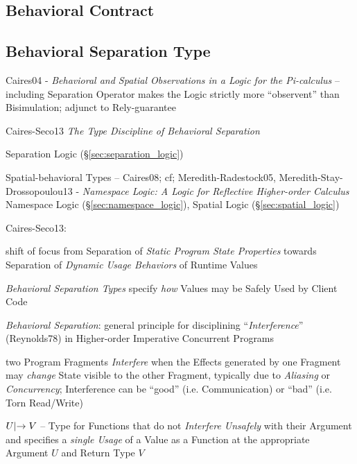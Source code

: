 \subsection{Behavioral Contract}\label{sec:behavioral_contract}

\subsection{Behavioral Separation Type}\label{sec:behavioral_separation}

Caires04 - \emph{Behavioral and Spatial Observations in a Logic for the
  Pi-calculus} -- including Separation Operator makes the Logic strictly more
``observent'' than Bisimulation; adjunct to Rely-guarantee

Caires-Seco13 \emph{The Type Discipline of Behavioral Separation}

Separation Logic (\S\ref{sec:separation_logic})

Spatial-behavioral Types -- Caires08; cf; Meredith-Radestock05,
Meredith-Stay-Drossopoulou13 - \emph{Namespace Logic: A Logic for Reflective
  Higher-order Calculus} \fist Namespace Logic
(\S\ref{sec:namespace_logic}), Spatial Logic (\S\ref{sec:spatial_logic})

Caires-Seco13:

shift of focus from Separation of \emph{Static Program State
  Properties} towards Separation of \emph{Dynamic Usage Behaviors} of
Runtime Values

\emph{Behavioral Separation Types} specify \emph{how} Values may be
Safely Used by Client Code

\emph{Behavioral Separation}: general principle for disciplining
``\emph{Interference}'' (Reynolds78) in Higher-order Imperative
Concurrent Programs

two Program Fragments \emph{Interfere} when the Effects generated by
one Fragment may \emph{change} State visible to the other Fragment,
typically due to \emph{Aliasing} or \emph{Concurrency}; Interference
can be ``good'' (i.e. Communication) or ``bad'' (i.e. Torn Read/Write)

$U \mathrlap{|}\rightarrow V$ -- Type for Functions that do not \emph{Interfere
  Unsafely} with their Argument and specifies a \emph{single Usage} of
a Value as a Function at the appropriate Argument $U$ and Return Type
$V$



